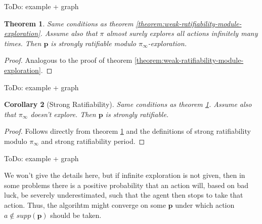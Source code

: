 \documentclass{article}
\newtheorem{thm}{Theorem} %
\newtheorem{corollary}[thm]{Corollary}
\begin{document}
ToDo: example + graph

\begin{thm}\label{theorem:strong-ratifiability-module-exploration}
Same conditions as theorem \ref{theorem:weak-ratifiability-module-exploration}. Assume also that $\pi$ almost surely explores all actions infinitely many times. Then $\mathbf{p}$ is strongly ratifiable modulo $\pi_\infty$-exploration. 
\end{thm}
\begin{proof}
Analogous to the proof of theorem \ref{theorem:weak-ratifiability-module-exploration}.
\end{proof}

ToDo: example + graph

\begin{corollary}[Strong Ratifiability]
Same conditions as theorem \ref{theorem:strong-ratifiability-module-exploration}. Assume also that $\pi_\infty$ doesn't explore. Then $\mathbf{p}$ is strongly ratifiable.
\end{corollary}
\begin{proof}
Follows directly from theorem \ref{theorem:strong-ratifiability-module-exploration} and the definitions of strong ratifiability modulo $\pi_\infty$ and strong ratifiability period.
\end{proof}

ToDo: example + graph

We won't give the details here, but if infinite exploration is not given, then in some problems there is a positive probability that an action will, based on bad luck, be severely underestimated, such that the agent then stops to take that action. Thus, the algorihtm might converge on some $\mathbf{p}$ under which action $a\notin supp(\mathbf{p})$ should be taken.
\end{document}
